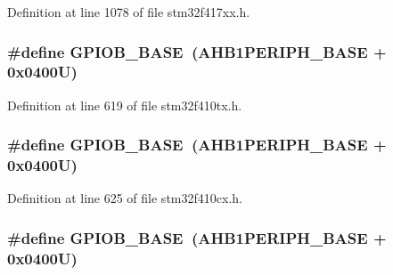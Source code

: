 Definition at line 1078 of file stm32f417xx.\+h.

\subsubsection[{\texorpdfstring{G\+P\+I\+O\+B\+\_\+\+B\+A\+SE}{GPIOB_BASE}}]{\setlength{\rightskip}{0pt plus 5cm}\#define G\+P\+I\+O\+B\+\_\+\+B\+A\+SE~({\bf A\+H\+B1\+P\+E\+R\+I\+P\+H\+\_\+\+B\+A\+SE} + 0x0400\+U)}\hypertarget{group___peripheral__registers__structures_gac944a89eb789000ece920c0f89cb6a68}{}\label{group___peripheral__registers__structures_gac944a89eb789000ece920c0f89cb6a68}


Definition at line 619 of file stm32f410tx.\+h.

\subsubsection[{\texorpdfstring{G\+P\+I\+O\+B\+\_\+\+B\+A\+SE}{GPIOB_BASE}}]{\setlength{\rightskip}{0pt plus 5cm}\#define G\+P\+I\+O\+B\+\_\+\+B\+A\+SE~({\bf A\+H\+B1\+P\+E\+R\+I\+P\+H\+\_\+\+B\+A\+SE} + 0x0400\+U)}\hypertarget{group___peripheral__registers__structures_gac944a89eb789000ece920c0f89cb6a68}{}\label{group___peripheral__registers__structures_gac944a89eb789000ece920c0f89cb6a68}


Definition at line 625 of file stm32f410cx.\+h.

\subsubsection[{\texorpdfstring{G\+P\+I\+O\+B\+\_\+\+B\+A\+SE}{GPIOB_BASE}}]{\setlength{\rightskip}{0pt plus 5cm}\#define G\+P\+I\+O\+B\+\_\+\+B\+A\+SE~({\bf A\+H\+B1\+P\+E\+R\+I\+P\+H\+\_\+\+B\+A\+SE} + 0x0400\+U)}\hypertarget{group___peripheral__registers__structures_gac944a89eb789000ece920c0f89cb6a68}{}\label{group___peripheral__registers__structures_gac944a89eb789000ece920c0f89cb6a68}


